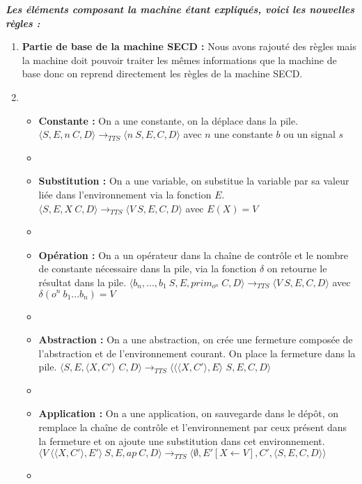 \documentclass[10pt,a4paper]{report}
\begin{document}
\textbf{\textit{Les éléments composant la machine étant expliqués, voici les nouvelles règles :}}
\smallbreak
\begin{enumerate}
\item[] \textbf{Partie de base de la machine SECD :} Nous avons rajouté des règles mais la machine doit pouvoir traiter les mêmes informations que la machine de base donc on reprend directement les règles de la machine SECD. 
\item[]
  \begin{itemize}
  \item[] \textbf{Constante :} On a une constante, on la déplace dans la pile.
    \smallbreak
    $\langle S,E,n~C,D\rangle 
    \longrightarrow_{TTS} 
    \langle n~S,E,C,D\rangle$ avec $n$ une constante $b$ ou un signal $s$
  \item[]
    
  \item[] \textbf{Substitution :} On a une variable, on substitue la variable par sa valeur liée dans l'environnement via la fonction $E$.
    \smallbreak
    $\langle S,E,X~C,D\rangle
    \longrightarrow_{TTS} 
    \langle V~S,E,C,D\rangle$ avec $E(X) = V$
  \item[]
    
  \item[] \textbf{Opération :} On a un opérateur dans la chaîne de contrôle et le nombre de constante nécessaire dans la pile, via la fonction $\delta$ on retourne le résultat dans la pile.
    \smallbreak
    $\langle b_{n},...,b_{1}~S,E,prim_{o^{n}}~C,D\rangle
    \longrightarrow_{TTS} 
    \langle V~S,E,C,D\rangle$ avec $\delta(o^{n}~b_{1}...b_{n}) = V$
  \item[]
    
  \item[]  \textbf{Abstraction :} On a une abstraction, on crée une fermeture composée de l'abstraction et de l'environnement courant. On place la fermeture dans la pile.
    \smallbreak
    $\langle S,E,\langle X,C'\rangle$ $C,D\rangle
    \longrightarrow_{TTS} 
    \langle \langle\langle X,C'\rangle,E\rangle$ $S,E,C,D\rangle$
  \item[]
    
  \item[]  \textbf{Application :} On a une application, on sauvegarde dans le dépôt, on remplace la chaîne de contrôle et l'environnement par ceux présent dans la fermeture et on ajoute une substitution dans cet environnement.
    \smallbreak
    $\langle V~\langle\langle X,C'\rangle,E'\rangle~S,E,ap~C,D\rangle
    \longrightarrow_{TTS} 
    \langle \emptyset,E'[X \leftarrow V],C',\langle S,E,C,D\rangle\rangle$
  \item[] 
    

\end{itemize}
\end{enumerate}
\end{document}
